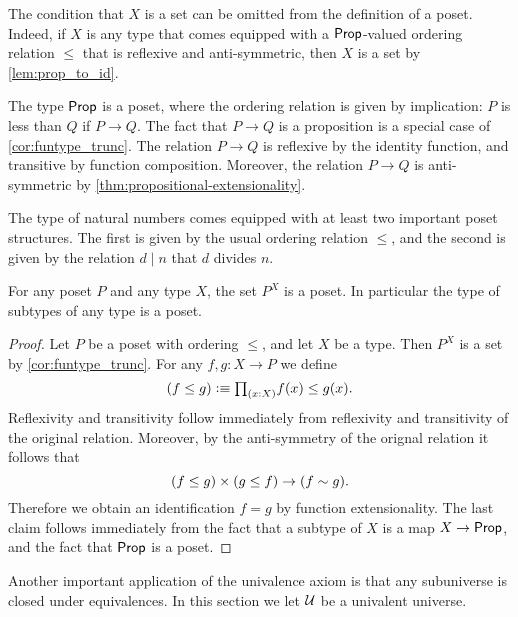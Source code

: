 \begin{rmk}
  The condition that $X$ is a set can be omitted from the definition of a poset. Indeed, if $X$ is any type that comes equipped with a $\mathsf{Prop}$-valued ordering relation $\leq$ that is reflexive and anti-symmetric, then $X$ is a set by \cref{lem:prop_to_id}.
\end{rmk}

\begin{eg}
  The type $\mathsf{Prop}$ is a poset, where the ordering relation is given by implication: $P$ is less than $Q$ if $P\to Q$. The fact that $P\to Q$ is a proposition is a special case of \cref{cor:funtype_trunc}. The relation $P\to Q$ is reflexive by the identity function, and transitive by function composition. Moreover, the relation $P\to Q$ is anti-symmetric by \cref{thm:propositional-extensionality}.
\end{eg}

\begin{eg}
  The type of natural numbers comes equipped with at least two important poset structures. The first is given by the usual ordering relation $\leq$, and the second is given by the relation $d\mid n$ that $d$ divides $n$.
\end{eg}

\begin{thm}
  For any poset $P$ and any type $X$, the set $P^X$ is a poset. In particular the type of subtypes of any type is a poset.
\end{thm}

\begin{proof}
  Let $P$ be a poset with ordering $\leq$, and let $X$ be a type. Then $P^X$ is a set by \cref{cor:funtype_trunc}. For any $f,g:X\to P$ we define
  \begin{equation*}
    (f\leq g) \defeq \prd{x:X}f(x)\leq g(x).
  \end{equation*}
  Reflexivity and transitivity follow immediately from reflexivity and transitivity of the original relation. Moreover, by the anti-symmetry of the orignal relation it follows that
  \begin{equation*}
    (f\leq g)\times (g\leq f) \to (f\sim g). 
  \end{equation*}
  Therefore we obtain an identification $f=g$ by function extensionality. The last claim follows immediately from the fact that a subtype of $X$ is a map $X\to\mathsf{Prop}$, and the fact that $\mathsf{Prop}$ is a poset.
\end{proof}

Another important application of the univalence axiom is that any subuniverse is closed under equivalences. In this section we let $\mathcal{U}$ be a univalent universe.

